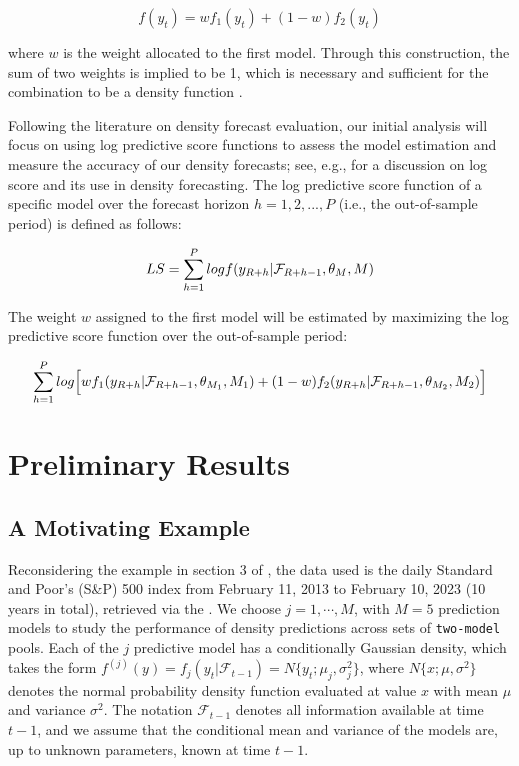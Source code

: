 \documentclass{monashthesis}
\begin{document}
\begin{equation}
f(y_t) = wf_1(y_t) + (1-w)f_2(y_t)
\end{equation}

where \(w\) is the weight allocated to the first model. Through this construction, the sum of two weights is implied to be 1, which is necessary and sufficient for the combination to be a density function \autocite{GA11}.

Following the literature on density forecast evaluation, our initial analysis will focus on using log predictive score functions to assess the model estimation and measure the accuracy of our density forecasts; see, e.g., \textcite{GA11} for a discussion on log score and its use in density forecasting. The log predictive score function of a specific model over the forecast horizon \(h=1,2,...,P\) (i.e., the out-of-sample period) is defined as follows:

\begin{equation}
LS = \sum^P_{h=1} logf(y_{\small{R+h}}| \mathcal{F}_{\small{R+h-1}}, \theta_M, M)
\end{equation}

The weight \(w\) assigned to the first model will be estimated by maximizing the log predictive score function over the out-of-sample period:

\begin{equation}
\sum^P_{h=1}log\Big[wf_1(y_{\small{R+h}}|\mathcal{F}_{\small{R+h-1}}, \theta_{M_1}, M_1) + (1-w)f_2(y_{\small{R+h}}|\mathcal{F}_{\small{R+h-1}}, \theta_{M_2}, M_2)\Big]
\end{equation}

\hypertarget{preliminary-results}{%
\chapter{Preliminary Results}\label{preliminary-results}}

\hypertarget{a-motivating-example}{%
\section{A Motivating Example}\label{a-motivating-example}}

Reconsidering the example in section 3 of \textcite{GA11}, the data used is the daily Standard and Poor's (S\&P) 500 index from February 11, 2013 to February 10, 2023 (10 years in total), retrieved via the \textcite{SP500}. We choose \(j=1,\cdots,M\), with \(M=5\) prediction models to study the performance of density predictions across sets of \texttt{two-model} pools. Each of the \(j\) predictive model has a conditionally Gaussian density, which takes the form \(f^{(j)}(y)=f_j(y_t|\mathcal{F}_{t-1})=N\{y_t; \mu_j, \sigma^2_j\}\), where \(N\{x; \mu, \sigma^2\}\) denotes the normal probability density function evaluated at value \(x\) with mean \(\mu\) and variance \(\sigma^2\). The notation \(\mathcal{F}_{t-1}\) denotes all information available at time \(t-1\), and we assume that the conditional mean and variance of the models are, up to unknown parameters, known at time \(t-1\).
\end{document}
